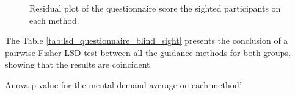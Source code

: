 \begin{figure}[!htb]
\begin{minipage}{0.45\textwidth}
        \caption{Residual plot of the questionnaire score the sighted participants on each method.}
        \label{fig:residplot_questionnaires_sight}
    \end{minipage}
\end{figure}

The Table \ref{tab:lsd_questionnaire_blind_sight} presents the conclusion of a pairwise Fisher LSD test between all the guidance methods for both groups, showing that the results are coincident.

\begin{table}
    \caption{Anova p-value for the mental demand average on each method'}
    \label{tab:lsd_questionnaire_blind_sight}
\begin{minipage}{1\textwidth}
    
\end{minipage}
\begin{minipage}{1\textwidth}
    
\end{minipage}
\end{table}

%


\FloatBarrier